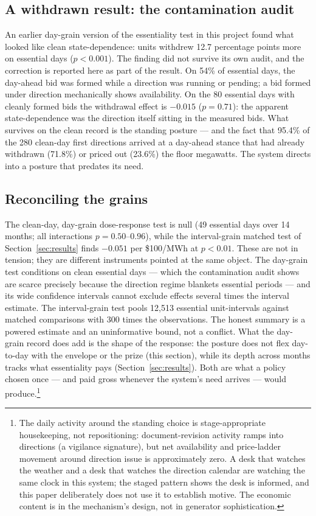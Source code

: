 \subsection{A withdrawn result: the contamination audit}

An earlier day-grain version of the essentiality test in this project found
what looked like clean state-dependence: units withdrew 12.7 percentage
points more on essential days ($p<0.001$). The finding did not survive its
own audit, and the correction is reported here as part of the result. On 54\%
of essential days, the day-ahead bid was formed while a direction was running
or pending; a bid formed under direction mechanically shows availability. On
the 80 essential days with cleanly formed bids the withdrawal effect is
$-0.015$ ($p=0.71$): the apparent state-dependence was the direction itself
sitting in the measured bids. What survives on the clean record is the
standing posture --- and the fact that 95.4\% of the 280 clean-day first
directions arrived at a day-ahead stance that had already withdrawn (71.8\%)
or priced out (23.6\%) the floor megawatts. The system directs into a posture
that predates its need.

\subsection{Reconciling the grains}

The clean-day, day-grain dose-response test is null (49 essential days over
14 months; all interactions $p=0.50$--$0.96$), while the interval-grain
matched test of Section~\ref{sec:results} finds $-0.051$ per \$100/MWh at
$p<0.01$. These are not in tension; they are different instruments pointed at
the same object. The day-grain test conditions on clean essential days ---
which the contamination audit shows are scarce precisely because the
direction regime blankets essential periods --- and its wide confidence
intervals cannot exclude effects several times the interval estimate. The
interval-grain test pools 12,513 essential unit-intervals against matched
comparisons with 300 times the observations. The honest summary is a powered
estimate and an uninformative bound, not a conflict. What the day-grain
record does add is the shape of the response: the posture does not flex
day-to-day with the envelope or the prize (this section), while its depth
across months tracks what essentiality pays (Section~\ref{sec:results}).
Both are what a policy chosen once --- and paid gross whenever the system's
need arrives --- would produce.\footnote{The daily activity around the
standing choice is stage-appropriate housekeeping, not repositioning:
document-revision activity ramps into directions (a vigilance signature), but
net availability and price-ladder movement around direction issue is
approximately zero. A desk that watches the weather and a desk that watches
the direction calendar are watching the same clock in this system; the staged
pattern shows the desk is informed, and this paper deliberately does not use
it to establish motive. The economic content is in the mechanism's design, not in generator
sophistication.}
